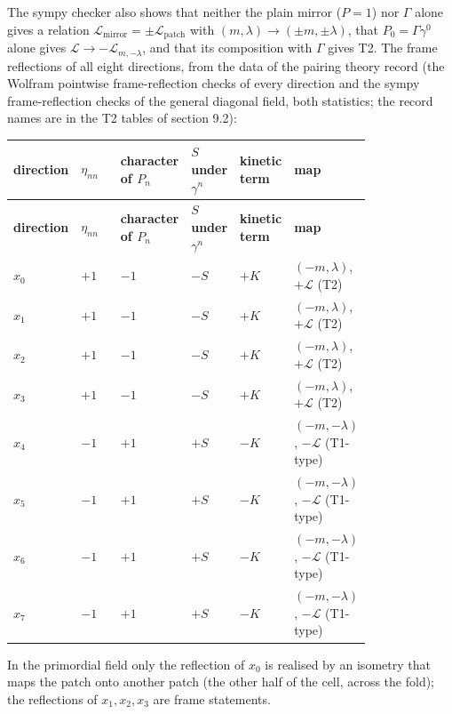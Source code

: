 \documentclass[11pt]{article}
\begin{document}
The sympy checker also shows that neither the plain mirror ($P = 1$) nor $\Gamma$ alone gives a relation $\mathcal{L}_{\mathrm{mirror}} = \pm\mathcal{L}_{\mathrm{patch}}$ with $(m,\lambda) \to (\pm m, \pm\lambda)$, that $P_0 = \Gamma\gamma^0$ alone gives $\mathcal{L} \to -\mathcal{L}_{m,-\lambda}$, and that its composition with $\Gamma$ gives T2. The frame reflections of all eight directions, from the data of the pairing theory record (the Wolfram pointwise frame-reflection checks of every direction and the sympy frame-reflection checks of the general diagonal field, both statistics; the record names are in the T2 tables of section 9.2):

\begingroup
\small
\begin{longtable}{@{}>{\raggedright\arraybackslash}p{0.133\linewidth}>{\raggedright\arraybackslash}p{0.133\linewidth}>{\raggedright\arraybackslash}p{0.133\linewidth}>{\raggedright\arraybackslash}p{0.133\linewidth}>{\raggedright\arraybackslash}p{0.133\linewidth}>{\raggedright\arraybackslash}p{0.133\linewidth}@{}}
\toprule
\textbf{direction} & \textbf{$\eta_{nn}$} & \textbf{character of $P_n$} & \textbf{$S$ under $\gamma^n$} & \textbf{kinetic term} & \textbf{map} \\
\midrule
\endfirsthead
\toprule
\textbf{direction} & \textbf{$\eta_{nn}$} & \textbf{character of $P_n$} & \textbf{$S$ under $\gamma^n$} & \textbf{kinetic term} & \textbf{map} \\
\midrule
\endhead
$x_0$ & $+1$ & $-1$ & $-S$ & $+K$ & $(-m,\lambda)$, $+\mathcal{L}$ (T2) \\
$x_1$ & $+1$ & $-1$ & $-S$ & $+K$ & $(-m,\lambda)$, $+\mathcal{L}$ (T2) \\
$x_2$ & $+1$ & $-1$ & $-S$ & $+K$ & $(-m,\lambda)$, $+\mathcal{L}$ (T2) \\
$x_3$ & $+1$ & $-1$ & $-S$ & $+K$ & $(-m,\lambda)$, $+\mathcal{L}$ (T2) \\
$x_4$ & $-1$ & $+1$ & $+S$ & $-K$ & $(-m,-\lambda)$, $-\mathcal{L}$ (T1-type) \\
$x_5$ & $-1$ & $+1$ & $+S$ & $-K$ & $(-m,-\lambda)$, $-\mathcal{L}$ (T1-type) \\
$x_6$ & $-1$ & $+1$ & $+S$ & $-K$ & $(-m,-\lambda)$, $-\mathcal{L}$ (T1-type) \\
$x_7$ & $-1$ & $+1$ & $+S$ & $-K$ & $(-m,-\lambda)$, $-\mathcal{L}$ (T1-type) \\
\bottomrule
\end{longtable}
\endgroup

In the primordial field only the reflection of $x_0$ is realised by an isometry that maps the patch onto another patch (the other half of the cell, across the fold); the reflections of $x_1, x_2, x_3$ are frame statements.
\end{document}
